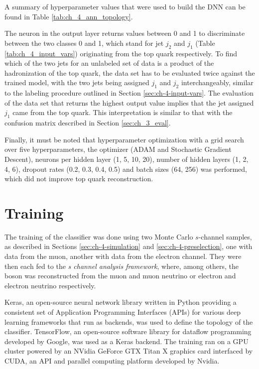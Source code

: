 A summary of hyperparameter values that were used to build the DNN can be found in Table \ref{tab:ch_4_ann_topology}.

The neuron in the output layer returns values between 0 and 1 to discriminate between the two classes 0 and 1, which stand for jet $j_2$ and $j_1$ (Table \ref{tab:ch_4_input_vars}) originating from the top quark respectively. To find which of the two jets for an unlabeled set of data is a product of the hadronization of the top quark, the data set has to be evaluated twice against the trained model, with the two jets being assigned $j_1$ and $j_2$ interchangeably, similar to the labeling procedure outlined in Section \ref{sec:ch-4-input-vars}. The evaluation of the data set that returns the highest output value implies that the jet assigned $j_1$ came from the top quark. This interpretation is similar to that with the confusion matrix described in Section \ref{sec:ch_3_eval}.

Finally, it must be noted that hyperparameter optimization with a grid search over five hyperparameters, the optimizer (ADAM and Stochastic Gradient Descent), neurons per hidden layer (1, 5, 10, 20), number of hidden layers (1, 2, 4, 6), dropout rates (0.2, 0.3, 0.4, 0.5) and batch sizes (64, 256) was performed, which did not improve top quark reconstruction.

\section{Training}
\label{sec:ch-4-training}
The training of the classifier was done using two Monte Carlo $s$-channel samples, as described in Sections \ref{sec:ch-4-simulation} and \ref{sec:ch-4-preselection}, one with data from the muon, another with data from the electron channel. They were then each fed to the \emph{s channel analysis framework}, where, among others, the \PWplus boson was reconstructed from the muon and muon neutrino or electron and electron neutrino respectively.

Keras, an open-source neural network library written in Python providing a consistent set of Application Programming Interfaces (APIs) for various deep learning frameworks that run as backends, was used to define the topology of the classifier. TensorFlow, an open-source software library for dataflow programming developed by Google, was used as a Keras backend. The training ran on a GPU cluster powered by an NVidia GeForce GTX Titan X \cite{misc:geforce} graphics card interfaced by CUDA, an API and parallel computing platform developed by Nvidia.

